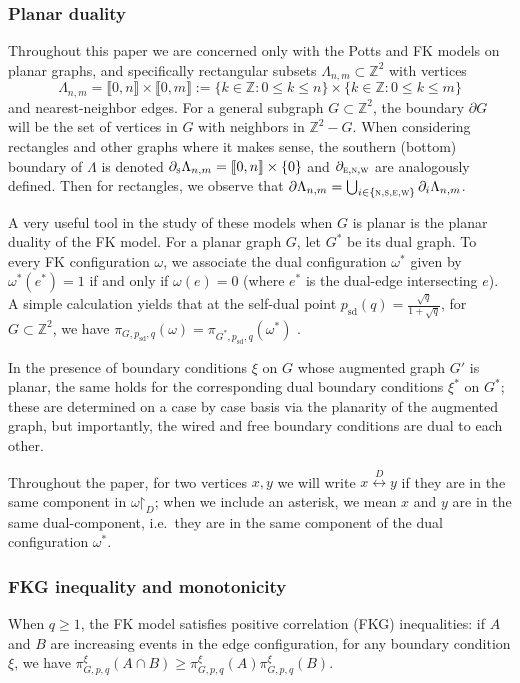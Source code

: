 \documentclass[reqno,11pt]{amsart}
\numberwithin{equation}{section}
\renewcommand{\restriction}{\mathord{\upharpoonright}}
\theoremstyle{definition}{
\newtheorem{example}[theorem]{Example}
\newtheorem{definition}[theorem]{Definition}
\newtheorem*{definition*}{Definition}
\newtheorem{problem}[theorem]{Problem}
\newtheorem{question}[theorem]{Question}
\newtheorem{remark}[theorem]{Remark}
}
\newcommand{\llb }{\llbracket}
\newcommand{\rrb }{\rrbracket}
\newcommand{\north}{{\textsc{n}}}
\newcommand{\south}{{\textsc{s}}}
\newcommand{\east}{{\textsc{e}}}
\newcommand{\west}{{\textsc{w}}}
\newcommand{\sd}{{\operatorname{sd}}}
\begin{document}
\subsubsection*{Planar duality}Throughout this paper we are concerned only with the Potts and FK models on planar graphs, and specifically rectangular subsets $\Lambda_{n,m}\subset \mathbb Z^2$ with vertices
\[\Lambda_{n,m}=\llb 0,n\rrb \times \llb 0,m\rrb := \{k\in \mathbb Z: 0\leq k \leq n\}\times \{k\in \mathbb Z: 0\leq k \leq m\}
\]
and nearest-neighbor edges. For a general subgraph $G\subset \mathbb Z^2$, the boundary $\partial G$ will be the set of vertices in $G$ with neighbors in $\mathbb Z^2-G$.  When considering rectangles and other graphs where it makes sense, the southern (bottom) boundary of $\Lambda$ is denoted $\partial_\south \Lambda_{n,m}= \llb 0,n\rrb \times \{0\}$ and $\partial_{\east,\north,\west}$ are analogously defined. Then for rectangles, we observe that $\partial \Lambda_{n,m} = \bigcup_{i\in \{\north,\south,\east,\west\}}\partial_{i}\Lambda_{n,m}$.

A very useful tool in the study of these models when $G$ is planar is the planar duality of the FK model. For a planar graph $G$, let $G^*$ be its dual graph. To every FK configuration $\omega$, we associate the dual configuration $\omega^*$ given by $\omega^*(e^*)=1$ if and only if $\omega(e)=0$ (where $e^*$ is the dual-edge intersecting $e$). A simple calculation yields that at the self-dual point $p_{\sd}(q) = \frac{\sqrt q} {1+\sqrt q}$, for $G\subset \mathbb Z^2$, we have $\pi_{G,p_{\sd},q}(\omega)=\pi_{G^*,p_{\sd},q} (\omega^*)$ .

In the presence of boundary conditions $\xi$ on $G$ whose augmented graph $G'$ is planar, the same holds for the corresponding dual boundary conditions $\xi^*$ on $G^*$; these are determined on a case by case basis via the planarity of the augmented graph, but importantly, the wired and free boundary conditions are dual to each other.

Throughout the paper, for two vertices $x,y$ we will write $x\stackrel{D}\longleftrightarrow y$ if they are in the same component in $\omega\restriction_{D}$; when we include an asterisk, we mean $x$ and $y$ are in the same dual-component, i.e.\ they are in the same component of the dual configuration $\omega^*$.

\subsubsection*{FKG inequality and monotonicity}When $q\geq 1$, the FK model satisfies positive correlation (FKG) inequalities: if $A$ and $B$ are increasing events in the edge configuration, for any boundary condition $\xi$, we have $\pi^\xi_{G,p,q}(A\cap B)\geq \pi^\xi_{G,p,q}(A)\pi^\xi_{G,p,q}(B)$.
\end{document}
